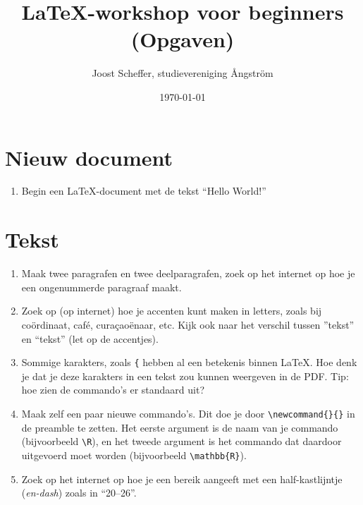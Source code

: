 \documentclass{article}
\title{\LaTeX-workshop voor beginners (Opgaven)}
\author{Joost Scheffer, studievereniging Ångström}
\date{\today}
\begin{document}
\maketitle
\section{Nieuw document}
\begin{enumerate}
	\item Begin een \LaTeX-document met de tekst ``Hello World!''
\end{enumerate}
\section{Tekst}
\begin{enumerate}
	\item Maak twee paragrafen en twee deelparagrafen, zoek op het internet op hoe je een ongenummerde paragraaf maakt.
	\item Zoek op (op internet) hoe je accenten kunt maken in letters, zoals bij coördinaat, café, curaçao\"enaar, etc. Kijk ook naar het verschil tussen ''tekst'' en ``tekst'' (let op de accentjes).
	\item  Sommige karakters, zoals \verb|{| hebben al een betekenis binnen \LaTeX. Hoe denk je dat je deze karakters in een tekst zou kunnen weergeven in de PDF. Tip: hoe zien de commando’s er standaard uit?
	\item Maak zelf een paar nieuwe commando’s. Dit doe je door \verb|\newcommand{}{}| in de preamble te zetten. Het eerste argument is de naam van je commando (bijvoorbeeld \verb|\R|), en het tweede argument is het commando dat daardoor uitgevoerd moet worden (bijvoorbeeld \verb|\mathbb{R}|).
	\item Zoek op het internet op hoe je een bereik aangeeft met een half-kastlijntje (\textit{en-dash}) zoals in ``20--26''.
\end{enumerate}
\end{document}
